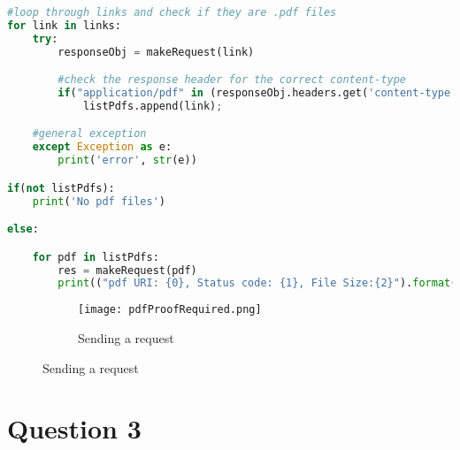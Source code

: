 \documentclass[11pt]{scrartcl} %
\begin{document}
\bigskip \bigskip

\begin{lstlisting}[language = Python, caption=Filtering pdf links]
#loop through links and check if they are .pdf files
for link in links:
	try:
		responseObj = makeRequest(link)

		#check the response header for the correct content-type
		if("application/pdf" in (responseObj.headers.get('content-type'))):
			listPdfs.append(link);

	#general exception
	except Exception as e:
		print('error', str(e))

if(not listPdfs):
	print('No pdf files')

else:

	for pdf in listPdfs:
		res = makeRequest(pdf)
		print(("pdf URI: {0}, Status code: {1}, File Size:{2}").format(pdf, res.status_code, res.headers['content-length']))


\end{lstlisting}


\begin{figure}[h!]
\begin{subfigure}[b]{0.9\linewidth }
    \texttt{[image: pdfProofRequired.png]}
    \caption{Sending a request}
\end{subfigure}
\end{figure}

\section*{Question 3} \bigskip 
\end{document}
